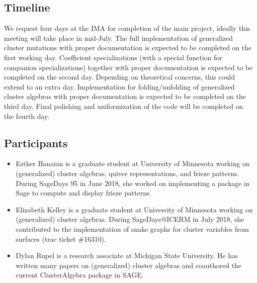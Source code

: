 \documentclass{amsart}
\begin{document}
  \subsection*{Timeline}
  We request four days at the IMA for completion of the main project, ideally this meeting will take place in mid-July.
  The full implementation of generalized cluster mutations with proper documentation is expected to be completed on the first working day.
  Coefficient specializations (with a special function for companion specializations) together with proper documentation is expected to be completed on the second day.
  Depending on theoretical concerns, this could extend to an extra day.
  Implementation for folding/unfolding of generalized cluster algebras with proper documentation is expected to be completed on the third day.
  Final polishing and uniformization of the code will be completed on the fourth day.

  \subsection*{Participants}
  \begin{itemize}
    \item Esther Banaian is a graduate student at University of Minnesota working on (generalized) cluster algebras, quiver representations, and frieze patterns.
      During SageDays 95 in June 2018, she worked on implementing a package in Sage to compute and display frieze patterns. 
    \item Elizabeth Kelley is a graduate student at University of Minnesota working on (generalized) cluster algebras.
      During SageDays@ICERM in July 2018, she contributed to the implementation of snake graphs for cluster variables from surfaces (trac ticket \#16310).
    \item Dylan Rupel is a research associate at Michigan State University.
      He has written many papers on (generalized) cluster algebras and coauthored the current ClusterAlgebra package in SAGE.
  \end{itemize}
\end{document}
